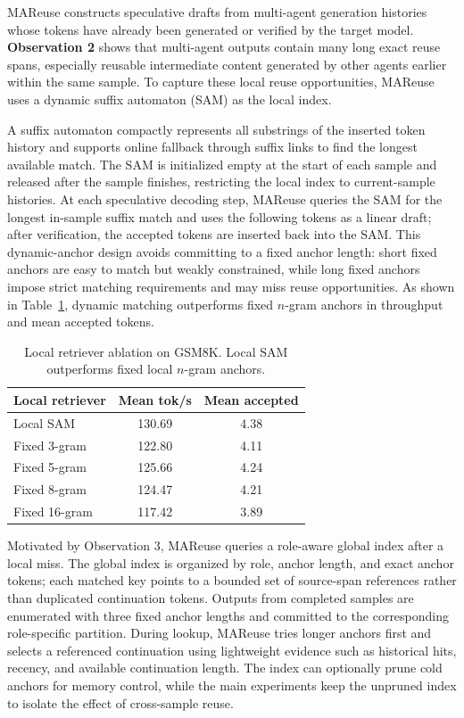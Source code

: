 \documentclass[letterpaper]{article} %
\begin{document}
MAReuse constructs speculative drafts from multi-agent generation histories whose tokens have already been generated or verified by the target model. \textbf{Observation 2} shows that multi-agent outputs contain many long exact reuse spans, especially reusable intermediate content generated by other agents earlier within the same sample. To capture these local reuse opportunities, MAReuse uses a dynamic suffix automaton (SAM) as the local index.

A suffix automaton compactly represents all substrings of the inserted token history and supports online fallback through suffix links to find the longest available match. The SAM is initialized empty at the start of each sample and released after the sample finishes, restricting the local index to current-sample histories. At each speculative decoding step, MAReuse queries the SAM for the longest in-sample suffix match and uses the following tokens as a linear draft; after verification, the accepted tokens are inserted back into the SAM. This dynamic-anchor design avoids committing to a fixed anchor length: short fixed anchors are easy to match but weakly constrained, while long fixed anchors impose strict matching requirements and may miss reuse opportunities. As shown in Table~\ref{tab:local-sam-ablation}, dynamic matching outperforms fixed $n$-gram anchors in throughput and mean accepted tokens.

\begin{table}[!t]
\centering
\setlength{\tabcolsep}{8pt}
\begin{tabular}{lcc}
\hline
Local retriever & Mean tok/s & Mean accepted \\
\hline
Local SAM & 130.69 & 4.38 \\
Fixed 3-gram & 122.80 & 4.11 \\
Fixed 5-gram & 125.66 & 4.24 \\
Fixed 8-gram & 124.47 & 4.21 \\
Fixed 16-gram & 117.42 & 3.89 \\
\hline
\end{tabular}
\caption{Local retriever ablation on GSM8K. Local SAM outperforms fixed local $n$-gram anchors.}
\label{tab:local-sam-ablation}
\end{table}

Motivated by Observation 3, MAReuse queries a role-aware global index after a local miss. The global index is organized by role, anchor length, and exact anchor tokens; each matched key points to a bounded set of source-span references rather than duplicated continuation tokens. Outputs from completed samples are enumerated with three fixed anchor lengths and committed to the corresponding role-specific partition. During lookup, MAReuse tries longer anchors first and selects a referenced continuation using lightweight evidence such as historical hits, recency, and available continuation length. The index can optionally prune cold anchors for memory control, while the main experiments keep the unpruned index to isolate the effect of cross-sample reuse.
\end{document}
